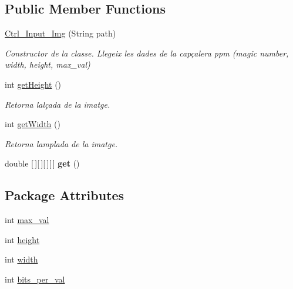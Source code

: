 \subsection*{Public Member Functions}
\begin{DoxyCompactItemize}
\item 
\hyperlink{classpersistencia_1_1input_1_1Ctrl__Input__Img_a79318a62df31dfd107554e92e29f6d9a}{Ctrl\+\_\+\+Input\+\_\+\+Img} (String path)
\begin{DoxyCompactList}\small\item\em Constructor de la classe. Llegeix les dades de la capçalera ppm (magic number, width, height, max\+\_\+val) \end{DoxyCompactList}\item 
int \hyperlink{classpersistencia_1_1input_1_1Ctrl__Input__Img_a55dc2906950235559f83b4765aea73e8}{get\+Height} ()
\begin{DoxyCompactList}\small\item\em Retorna l\textquotesingle{}alçada de la imatge. \end{DoxyCompactList}\item 
int \hyperlink{classpersistencia_1_1input_1_1Ctrl__Input__Img_ab4cda237a52c99efb4411e0e86f3d3a2}{get\+Width} ()
\begin{DoxyCompactList}\small\item\em Retorna l\textquotesingle{}amplada de la imatge. \end{DoxyCompactList}\item 
\mbox{\label{classpersistencia_1_1input_1_1Ctrl__Input__Img_ac549527b5947a7ec9f40d53e492f4ffa}} 
double \mbox{[}$\,$\mbox{]}\mbox{[}$\,$\mbox{]}\mbox{[}$\,$\mbox{]}\mbox{[}$\,$\mbox{]} {\bfseries get} ()
\end{DoxyCompactItemize}
\subsection*{Package Attributes}
\begin{DoxyCompactItemize}
\item 
int \hyperlink{classpersistencia_1_1input_1_1Ctrl__Input__Img_a1b8fa2d000a1d5d873be62d1f609e4be}{max\+\_\+val}
\item 
int \hyperlink{classpersistencia_1_1input_1_1Ctrl__Input__Img_abc1dcc48714e9e74fb8ae0e0b81f91bf}{height}
\item 
int \hyperlink{classpersistencia_1_1input_1_1Ctrl__Input__Img_a51dd0b9243b854aa25ac4532acca4524}{width}
\item 
int \hyperlink{classpersistencia_1_1input_1_1Ctrl__Input__Img_a222ad0e7d241e5f396cf67c3b760f143}{bits\+\_\+per\+\_\+val}
\end{DoxyCompactItemize}
